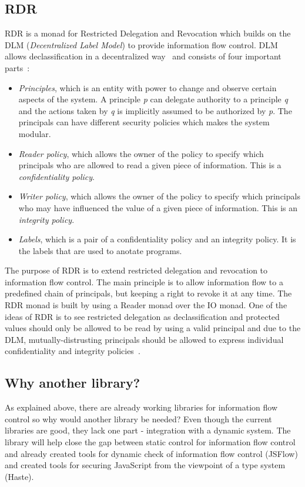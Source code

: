 \subsection{RDR}
RDR is a monad for Restricted Delegation and Revocation which builds on the DLM (\emph{Decentralized Label Model}) to provide information flow control. DLM allows declassification in a decentralized way~\cite{dlm} and consists of four important parts~\cite{dlm-site}:
\begin{itemize}
  \item \emph{Principles}, which is an entity with power to change and observe certain aspects of the system. A principle \emph{p} can delegate authority to a principle \emph{q} and the actions taken by \emph{q} is implicitly assumed to be authorized by \emph{p}. The principals can have different security policies which makes the system modular.
  \item \emph{Reader policy}, which allows the owner of the policy to specify which principals who are allowed to read a given piece of information. This is a \emph{confidentiality policy}.
  \item \emph{Writer policy}, which allows the owner of the policy to specify which principals who may have influenced the value of a given piece of information. This is an \emph{integrity policy}.
  \item \emph{Labels}, which is a pair of a confidentiality policy and an integrity policy. It is the labels that are used to anotate programs.
\end{itemize}

The purpose of RDR is to extend restricted delegation and revocation to information flow control. The main principle is to allow information flow to a predefined chain of principals, but keeping a right to revoke it at any time. The RDR monad is built by using a Reader monad over the IO monad. One of the ideas of RDR is to see restricted delegation as declassification and protected values should only be allowed to be read by using a valid principal and due to the DLM, mutually-distrusting principals should be allowed to express individual confidentiality and integrity policies~\cite{rdr}.
\subsection{Why another library?}
As explained above, there are already working libraries for information flow control so why would another library be needed? Even though the current libraries are good, they lack one part - integration with a dynamic system. The library will help close the gap between static control for information flow control and already created tools for dynamic check of information flow control (JSFlow) and created tools for securing JavaScript from the viewpoint of a type system (Haste).


